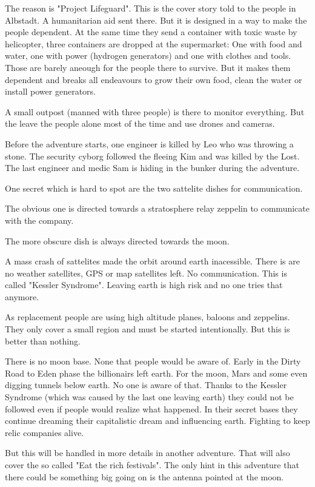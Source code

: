 The reason is "Project Lifeguard". This is the cover story told to the people in Albstadt. A humanitarian aid sent there. But it is designed in a way to make the people dependent. At the same time they send a container with toxic waste by helicopter, three containers are dropped at the supermarket: One with food and water, one with power (hydrogen generators) and one with clothes and tools.
Those are barely aneough for the people there to survive. But it makes them dependent and breaks all endeavours to grow their own food, clean the water or install power generators.

A small outpost (manned with three people) is there to monitor everything. But the leave the people alone most of the time and use drones and cameras.

Before the adventure starts, one engineer is killed by Leo who was throwing a stone. The security cyborg followed the fleeing Kim and was killed by the Lost.
The last engineer and medic Sam is hiding in the bunker during the adventure.

One secret which is hard to spot are the two sattelite dishes for communication.

The obvious one is directed towards a stratosphere relay zeppelin to communicate with the company.

The more obscure dish is always directed towards the moon.

\begin{sidebarBox}[title=Kessler Syndrome]

    A mass crash of sattelites made the orbit around earth inacessible. There is are no weather satellites, GPS or map satellites left. No communication.
    This is called "Kessler Syndrome". Leaving earth is high risk and no one tries that anymore.

    As replacement people are using high altitude planes, baloons and zeppelins. They only cover a small region and must be started intentionally. But this is better than nothing.
\end{sidebarBox}


\begin{sidebarBox}[title=Moon base]

    There is no moon base. None that people would be aware of. Early in the Dirty Road to Eden phase the billionairs left earth. For the moon, Mars and some even digging tunnels below earth. No one is aware of that. Thanks to the Kessler Syndrome (which was caused by the last one leaving earth) they could not be followed even if people would realize what happened.
    In their secret bases they continue dreaming their capitalistic dream and influencing earth. Fighting to keep relic companies alive.

    But this will be handled in more details in another adventure. That will also cover the so called "Eat the rich festivals". The only hint in this adventure that there could be something big going on is the antenna pointed at the moon.
\end{sidebarBox}

